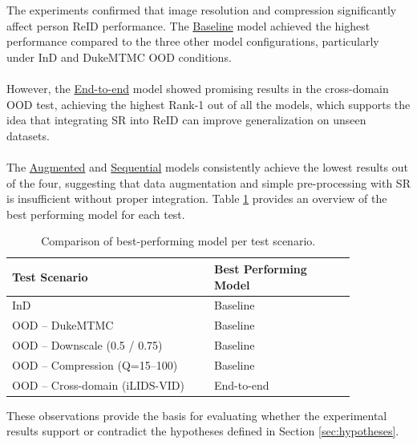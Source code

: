 The experiments confirmed that image resolution and compression significantly affect person \acs{ReID} performance. The \hyperlink{model:baseline}{Baseline} model achieved the highest performance compared to the three other model configurations, particularly under \acs{InD} and \acs{DukeMTMC} \acs{OOD} conditions. 
\\\\
However, the \hyperlink{model:entoend}{End-to-end} model showed promising results in the cross-domain \acs{OOD} test, achieving the highest Rank-1 out of all the models, which supports the idea that integrating \acs{SR} into \acs{ReID} can improve generalization on unseen datasets. 
\\\\
The \hyperlink{model:augmented}{Augmented} and \hyperlink{model:sequential}{Sequential} models consistently achieve the lowest results out of the four, suggesting that data augmentation and simple pre-processing with \acs{SR} is insufficient without proper integration. Table \ref{tab:model_comparison_summary} provides an overview of the best performing  model for each test.

\begin{table}[H]
\centering
\renewcommand{\arraystretch}{1.2}
\begin{tabular}{|>{\raggedright\arraybackslash}p{0.5\linewidth} |>{\centering\arraybackslash}p{0.35\linewidth}|}
\hline
\rowcolor[HTML]{D8E9F7}
\textbf{Test Scenario} & \textbf{Best Performing Model} \\
\hline
InD & Baseline \\
\hline
OOD – DukeMTMC & Baseline \\
\hline
OOD – Downscale (0.5 / 0.75) & Baseline \\
\hline
OOD – Compression (Q=15–100) & Baseline \\
\hline
OOD – Cross-domain (iLIDS-VID) & End-to-end \\
\hline
\end{tabular}
\caption{Comparison of best-performing model per test scenario.}
\label{tab:model_comparison_summary}
\end{table}

\noindent These observations provide the basis for evaluating whether the experimental results support or contradict the hypotheses defined in Section \ref{sec:hypotheses}. 

